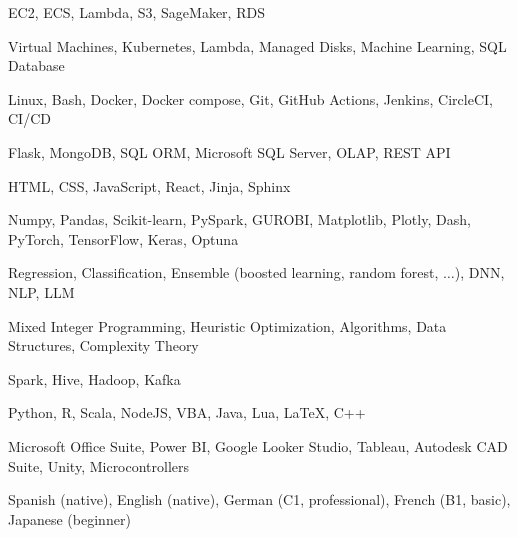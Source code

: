 

\begin{cvskills}

	{EC2, ECS, Lambda, S3, SageMaker, RDS} %

	{Virtual Machines, Kubernetes, Lambda, Managed Disks, Machine Learning, SQL Database} %

	{Linux, Bash, Docker, Docker compose, Git, GitHub Actions, Jenkins, CircleCI, CI/CD} %

	{Flask, MongoDB, SQL ORM, Microsoft SQL Server, OLAP, REST API} %

	{HTML, CSS, JavaScript, React, Jinja, Sphinx} %

	{Numpy, Pandas, Scikit-learn, PySpark, GUROBI, Matplotlib, Plotly, Dash, PyTorch, TensorFlow, Keras, Optuna} %

	{Regression, Classification, Ensemble (boosted learning, random forest, \(\dots\)), DNN, NLP, LLM} %

	{Mixed Integer Programming, Heuristic Optimization, Algorithms, Data Structures, Complexity Theory} %

	{Spark, Hive, Hadoop, Kafka} %

	{Python, R, Scala, NodeJS, VBA, Java, Lua, LaTeX, C++} %

	{Microsoft Office Suite, Power BI, Google Looker Studio, Tableau, Autodesk CAD Suite, Unity, Microcontrollers} %

	{Spanish (native), English (native), German (C1, professional), French (B1, basic), Japanese (beginner)} %

\end{cvskills}
